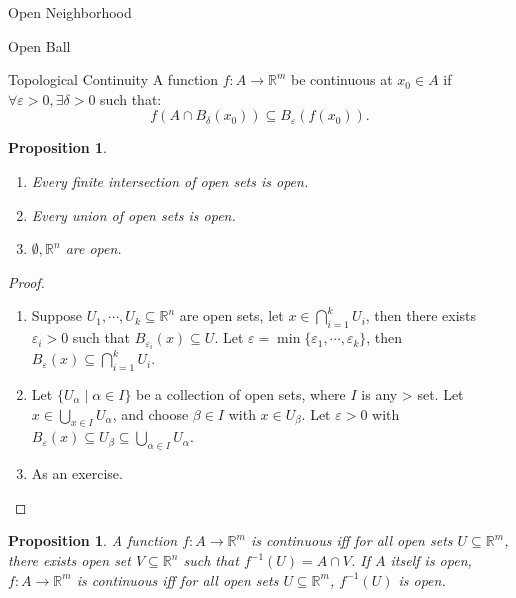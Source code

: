 \documentclass[11pt]{article}
\makeatletter
\newcounter{thmcounter}
\newenvironment{definition}[1]{\begin{defbox}{#1}{}}{\end{defbox}}
\theoremstyle{quiet}
\newtheorem{proposition}[thmcounter]{Proposition}
\newtheorem{proposition}[tcb@cnt@defbox]{Proposition}
\theoremstyle{quietremark}
\makeatother
\begin{document}
\begin{definition}{Open Neighborhood}
\end{definition}

\begin{definition}{Open Ball}
\end{definition}

\begin{definition}{Topological Continuity}
A function $f:A\to\mathbb{R}^m$ be continuous at $x_0\in A$ if $\forall \varepsilon>0,\exists\delta>0$ such that: 
\[
f(A\cap B_\delta(x_0))\subseteq B_\varepsilon(f(x_0)).
\]
\end{definition}

\begin{proposition}
\begin{enumerate}
\item Every finite intersection of open sets is open.
\item Every union of open sets is open.
\item $\emptyset, \mathbb{R}^n$ are open.
\end{enumerate}
\end{proposition}

\begin{proof}
\begin{enumerate}
\item Suppose $U_1,\cdots,U_k\subseteq\mathbb{R}^n$ are open sets, let $x\in\bigcap_{i=1}^kU_i$, then there exists $\varepsilon_i>0$ such that $B_{\varepsilon_i}(x)\subseteq U$. Let $\varepsilon=\min\{\varepsilon_1,\cdots,\varepsilon_k\}$, then $B_{\varepsilon}(x)\subseteq\bigcap_{i=1}^k U_i$.
\item Let $\{U_\alpha\mid \alpha\in I\}$ be a collection of open sets, where $I$ is any > set. Let $x\in\bigcup_{x\in I}U_\alpha$, and choose $\beta\in I$ with $x\in U_\beta$. Let $\varepsilon>0$ with $B_\varepsilon(x)\subseteq U_\beta\subseteq\bigcup_{\alpha\in I}U_\alpha$.
\item As an exercise.
\end{enumerate}
\end{proof}

\begin{proposition}
A function $f:A\to\mathbb{R}^m$ is continuous iff for all open sets $U\subseteq\mathbb{R}^m$, there exists open set $V\subseteq\mathbb{R}^n$ such that $f^{-1}(U)=A\cap V$. If $A$ itself is open, $f:A\to\mathbb{R}^m$ is continuous iff for all open sets $U\subseteq\mathbb{R}^m$, $f^{-1}(U)$ is open.
\end{proposition}
\end{document}
